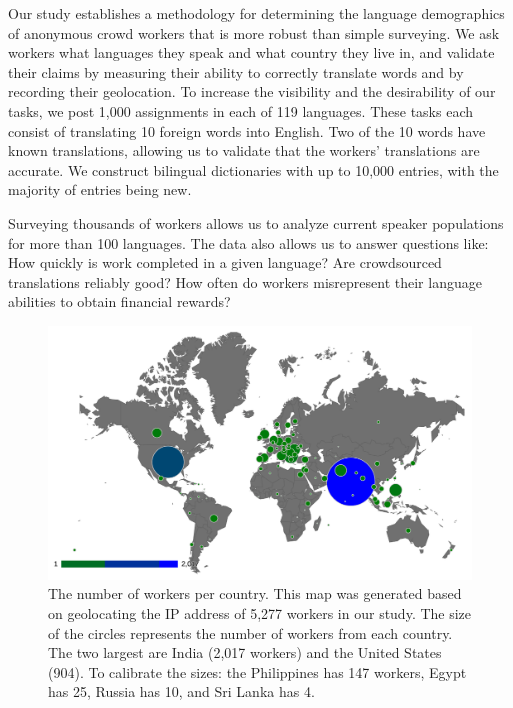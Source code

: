 \documentclass[11pt]{article}
\begin{document}
Our study establishes a methodology for determining the language demographics of anonymous crowd workers that is more robust than simple surveying. We ask workers what languages they speak and what country they live in, and validate their claims by measuring their ability to correctly translate words and by recording their geolocation.  To increase the visibility and the desirability of our tasks, we post 1,000 assignments in each of 119 languages.  These tasks each consist of translating 10 foreign words into English.  Two of the 10 words have known translations, allowing us to validate that the workers' translations are accurate.  We construct bilingual dictionaries with up to 10,000 entries, with the majority of entries being new. 

Surveying thousands of workers allows us to analyze current speaker populations for more than 100 languages.  The data also allows us to answer questions like: 
How quickly is work completed in a given language? 
Are crowdsourced translations reliably good? 
How often do workers misrepresent their language abilities to obtain financial rewards? 

\begin{figure}[h]
\centering
\includegraphics[width=\linewidth]{final-figures/turkermap}
\caption{The number of workers per country.  This map was generated based on geolocating the IP address of  5,277 workers in our study.  The size of the circles represents the number of workers from each country.  The two largest are India (2,017 workers) and the United States (904).  To calibrate the sizes: the Philippines has 147 workers, Egypt has 25, Russia has 10, and Sri Lanka has 4.}
\label{map}
\end{figure}
\end{document}

